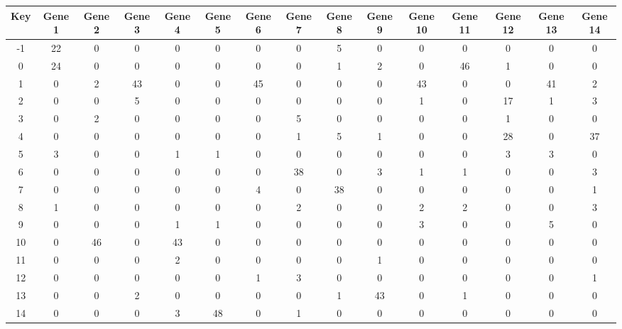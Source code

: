 \begin{tabular}{|c|c|c|c|c|c|c|c|c|c|c|c|c|c|c|}
\hline
Key & Gene 1 & Gene 2 & Gene 3 & Gene 4 & Gene 5 & Gene 6 & Gene 7 & Gene 8 & Gene 9 & Gene 10 & Gene 11 & Gene 12 & Gene 13 & Gene 14 \\
\hline
-1 & 22 & 0 & 0 & 0 & 0 & 0 & 0 & 5 & 0 & 0 & 0 & 0 & 0 & 0 \\
0 & 24 & 0 & 0 & 0 & 0 & 0 & 0 & 1 & 2 & 0 & 46 & 1 & 0 & 0 \\
1 & 0 & 2 & 43 & 0 & 0 & 45 & 0 & 0 & 0 & 43 & 0 & 0 & 41 & 2 \\
2 & 0 & 0 & 5 & 0 & 0 & 0 & 0 & 0 & 0 & 1 & 0 & 17 & 1 & 3 \\
3 & 0 & 2 & 0 & 0 & 0 & 0 & 5 & 0 & 0 & 0 & 0 & 1 & 0 & 0 \\
4 & 0 & 0 & 0 & 0 & 0 & 0 & 1 & 5 & 1 & 0 & 0 & 28 & 0 & 37 \\
5 & 3 & 0 & 0 & 1 & 1 & 0 & 0 & 0 & 0 & 0 & 0 & 3 & 3 & 0 \\
6 & 0 & 0 & 0 & 0 & 0 & 0 & 38 & 0 & 3 & 1 & 1 & 0 & 0 & 3 \\
7 & 0 & 0 & 0 & 0 & 0 & 4 & 0 & 38 & 0 & 0 & 0 & 0 & 0 & 1 \\
8 & 1 & 0 & 0 & 0 & 0 & 0 & 2 & 0 & 0 & 2 & 2 & 0 & 0 & 3 \\
9 & 0 & 0 & 0 & 1 & 1 & 0 & 0 & 0 & 0 & 3 & 0 & 0 & 5 & 0 \\
10 & 0 & 46 & 0 & 43 & 0 & 0 & 0 & 0 & 0 & 0 & 0 & 0 & 0 & 0 \\
11 & 0 & 0 & 0 & 2 & 0 & 0 & 0 & 0 & 1 & 0 & 0 & 0 & 0 & 0 \\
12 & 0 & 0 & 0 & 0 & 0 & 1 & 3 & 0 & 0 & 0 & 0 & 0 & 0 & 1 \\
13 & 0 & 0 & 2 & 0 & 0 & 0 & 0 & 1 & 43 & 0 & 1 & 0 & 0 & 0 \\
14 & 0 & 0 & 0 & 3 & 48 & 0 & 1 & 0 & 0 & 0 & 0 & 0 & 0 & 0 \\
\hline
\end{tabular}